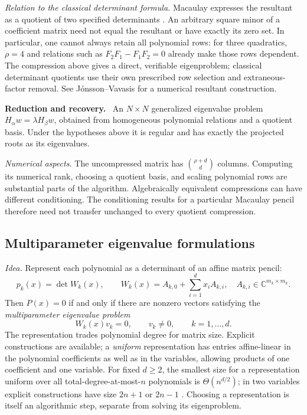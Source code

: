 \documentclass[12pt]{article}
\def\C{\mathbb{C}}
\theoremstyle{definition}
\theoremstyle{remark}
\newenvironment{reduction}
  {\par\medskip\noindent\textbf{Reduction and recovery.}\ }
  {\par\medskip}
\begin{document}
\emph{Relation to the classical determinant formula.} Macaulay expresses the resultant
as a quotient of two specified determinants \cite{macaulay1902some,macaulay1916algebraic}.
An arbitrary square minor of a coefficient matrix need not equal the resultant or have
exactly its zero set. In particular, one cannot always retain all polynomial rows:
for three quadratics, $\rho=4$ and relations such as $F_2F_1-F_1F_2=0$ already make
those rows dependent. The compression above gives a direct, verifiable eigenproblem;
classical determinant quotients use their own prescribed row selection and extraneous-factor
removal. See J\'onsson--Vavasis \cite{jonsson2005accurate} for a numerical resultant construction.

\begin{reduction}
  An $N\times N$ generalized eigenvalue problem $H_\alpha w=\lambda H_\beta w$, obtained
  from homogeneous polynomial relations and a quotient basis. Under the hypotheses above
  it is regular and has exactly the projected roots as its eigenvalues.
\end{reduction}

\emph{Numerical aspects.} The uncompressed matrix has $\binom{\rho+d}{d}$ columns.
Computing its numerical rank, choosing a quotient basis, and scaling polynomial rows
are substantial parts of the algorithm. Algebraically equivalent compressions can have
different conditioning. The conditioning results for a particular Macaulay pencil
\cite{graf2026numerical} therefore need not transfer unchanged to every quotient compression.

\subsection{Multiparameter eigenvalue formulations}\label{sec:mep}

\emph{Idea.} Represent each polynomial as a determinant of an affine matrix pencil:
\[
  p_k(x)=\det W_k(x),\qquad
  W_k(x)=A_{k,0}+\sum_{i=1}^d x_iA_{k,i},\quad A_{k,i}\in\C^{m_k\times m_k}.
\]
Then $P(x)=0$ if and only if there are nonzero vectors satisfying the
\emph{multiparameter eigenvalue problem}
\begin{equation}\label{eq:mep}
  W_k(x)v_k=0,\qquad v_k\ne0,\qquad k=1,\ldots,d.
\end{equation}
The representation trades polynomial degree for matrix size. Explicit constructions
are available; a \emph{uniform} representation has entries affine-linear in the polynomial
coefficients as well as in the variables, allowing products of one coefficient and one
variable. For fixed $d\ge2$, the smallest size for a representation uniform over all
total-degree-at-most-$n$ polynomials is $\Theta(n^{d/2})$; in two variables explicit constructions have
size $2n+1$ or $2n-1$ \cite{boralevi2017uniform}. Choosing a representation is itself
an algorithmic step, separate from solving its eigenproblem.
\end{document}
